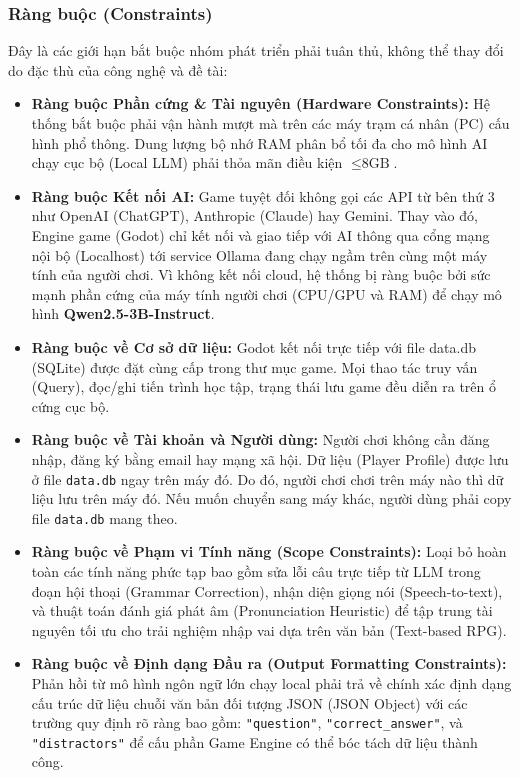 \subsubsection{Ràng buộc (Constraints)}
Đây là các giới hạn bắt buộc nhóm phát triển phải tuân thủ, không thể thay đổi do đặc thù của công nghệ và đề tài:
\begin{itemize}
    \item \textbf{Ràng buộc Phần cứng \& Tài nguyên (Hardware Constraints):} Hệ thống bắt buộc phải vận hành mượt mà trên các máy trạm cá nhân (PC) cấu hình phổ thông. Dung lượng bộ nhớ RAM phân bổ tối đa cho mô hình AI chạy cục bộ (Local LLM) phải thỏa mãn điều kiện $\le \text{8GB}$.
    \item \textbf{Ràng buộc Kết nối AI:} Game tuyệt đối không gọi các API từ bên thứ 3 như OpenAI (ChatGPT), Anthropic (Claude) hay Gemini. Thay vào đó, Engine game (Godot) chỉ kết nối và giao tiếp với AI thông qua cổng mạng nội bộ (Localhost) tới service Ollama đang chạy ngầm trên cùng một máy tính của người chơi. Vì không kết nối cloud, hệ thống bị ràng buộc bởi sức mạnh phần cứng của máy tính người chơi (CPU/GPU và RAM) để chạy mô hình \textbf{Qwen2.5-3B-Instruct}.
    \item \textbf{Ràng buộc về Cơ sở dữ liệu:} Godot kết nối trực tiếp với file data.db (SQLite) được đặt cùng cấp trong thư mục game. Mọi thao tác truy vấn (Query), đọc/ghi tiến trình học tập, trạng thái lưu game đều diễn ra trên ổ cứng cục bộ.
    \item \textbf{Ràng buộc về Tài khoản và Người dùng:} Người chơi không cần đăng nhập, đăng ký bằng email hay mạng xã hội. Dữ liệu (Player Profile) được lưu ở file \texttt{data.db} ngay trên máy đó. Do đó, người chơi chơi trên máy nào thì dữ liệu lưu trên máy đó. Nếu muốn chuyển sang máy khác, người dùng phải copy file \texttt{data.db} mang theo.
    \item \textbf{Ràng buộc về Phạm vi Tính năng (Scope Constraints):} Loại bỏ hoàn toàn các tính năng phức tạp bao gồm sửa lỗi câu trực tiếp từ LLM trong đoạn hội thoại (Grammar Correction), nhận diện giọng nói (Speech-to-text), và thuật toán đánh giá phát âm (Pronunciation Heuristic) để tập trung tài nguyên tối ưu cho trải nghiệm nhập vai dựa trên văn bản (Text-based RPG).
    \item \textbf{Ràng buộc về Định dạng Đầu ra (Output Formatting Constraints):} Phản hồi từ mô hình ngôn ngữ lớn chạy local phải trả về chính xác định dạng cấu trúc dữ liệu chuỗi văn bản đối tượng JSON (JSON Object) với các trường quy định rõ ràng bao gồm: \texttt{"question"}, \texttt{"correct\_answer"}, và \texttt{"distractors"} để cấu phần Game Engine có thể bóc tách dữ liệu thành công.
\end{itemize}

